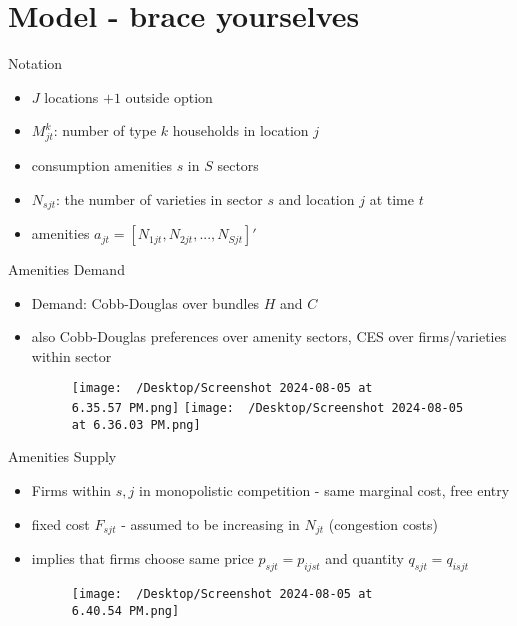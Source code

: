 \section{Model - brace yourselves}
\begin{frame}{Notation}
   \begin{itemize}
        \item $J$ locations $+ 1$ outside option
        \item $M_{jt}^{k}$: number of type $k$ households in location $j$
        \item consumption amenities $s$ in $S$ sectors
        \item $N_{sjt}$: the number of varieties in sector $s$ and location $j$ at time $t$
        \item amenities $a_{jt} = [N_{1jt}, N_{2jt}, ..., N_{Sjt}]'$
   \end{itemize}
\end{frame}
\begin{frame}{Amenities Demand}
    \begin{itemize}
         \item Demand: Cobb-Douglas over bundles $H$ and $C$
         \item also Cobb-Douglas preferences over amenity sectors, CES over firms/varieties within sector
         \begin{figure}
            \centering
            \texttt{[image: ~/Desktop/Screenshot 2024-08-05 at 6.35.57 PM.png]}
            \texttt{[image: ~/Desktop/Screenshot 2024-08-05 at 6.36.03 PM.png]}
            \caption{}
            \label{fig:photo}
        \end{figure}
    \end{itemize}
 \end{frame}

\begin{frame}{Amenities Supply}
    \begin{itemize}
         \item Firms within $s, j$ in monopolistic competition - same marginal cost, free entry
         \item fixed cost $F_{sjt}$ - assumed to be increasing in $N_{jt}$ (congestion costs)
         \item implies that firms choose same price $p_{sjt} = p_{ijst}$ and quantity $q_{sjt} = q_{isjt}$
         \begin{figure}
            \centering
            \texttt{[image: ~/Desktop/Screenshot 2024-08-05 at 6.40.54 PM.png]}
            \caption{}
            \label{fig:photo}
        \end{figure}
    \end{itemize}
 \end{frame}

